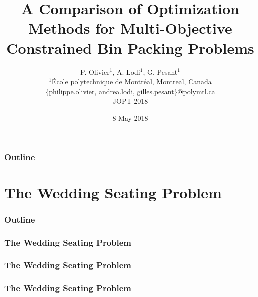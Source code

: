 \documentclass{beamer}
\title[Comparison of Optimization Methods]{A Comparison of Optimization Methods for Multi-Objective Constrained Bin Packing Problems}
\author[P. Olivier, A. Lodi, G. Pesant] {
  P. Olivier$^1$, A. Lodi$^1$, G. Pesant$^1$ \\
  \vspace{0.5cm}
  \scriptsize $^1$École polytechnique de Montréal, Montreal, Canada \\
  \{philippe.olivier, andrea.lodi, gilles.pesant\}@polymtl.ca \\
  \vspace{1cm}
  \normalsize JOPT 2018
}
\date[JOPT 2018]{8 May 2018}
\newcommand{\AutoSectionTitle}{}
\begin{document}
\begin{frame}
  \titlepage
\end{frame}

\begin{frame}
  \frametitle{Outline}
  \tableofcontents
\end{frame}




\renewcommand{\AutoSectionTitle}{The Wedding Seating Problem}

\section{\AutoSectionTitle}

\begin{frame}
  \frametitle{Outline}
  \tableofcontents[currentsection]
\end{frame}




\begin{frame}
  \frametitle{\AutoSectionTitle}
  
  \begin{center}
    
  \end{center}
  
\end{frame}




\begin{frame}
  \frametitle{\AutoSectionTitle}
  
  \begin{center}
    
  \end{center}
  
\end{frame}




\begin{frame}
  \frametitle{\AutoSectionTitle}
  
  \begin{center}
    
  \end{center}
  
\end{frame}
\end{document}
